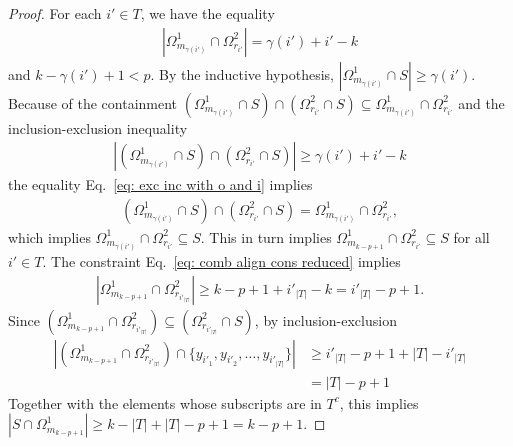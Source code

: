 \documentclass[10pt,a4paper]{amsart}
\newcommand{\Og}{\Omega}
\newcommand{\ga}{\gamma}
\begin{document}
\begin{proof}
For each \(i' \in T\), we have the equality
\begin{align}
\label{eq: exc inc with o and i}
| \Og^1_{m_{\ga(i')}} \cap \Og^2_{r_{i'}}| = \ga(i') + i' - k
\end{align}
and \(k-\ga(i')+1 < p\). By the inductive hypothesis,  \(|\Og^1_{m_{\ga(i')}} \cap S| \geq \ga(i')\). 
Because of the containment \((\Og^1_{m_{\ga(i')}} \cap S) \cap (\Og^2_{r_{i'}} \cap S) \subseteq \Og^1_{m_{\ga(i')}} \cap \Og^2_{r_{i'}}\) and the inclusion-exclusion inequality
\begin{gather}
| (\Og^1_{m_{\ga(i')}} \cap S) \cap (\Og^2_{r_{i'}} \cap S)| \geq \ga(i') + i' - k
\end{gather}
the equality Eq.~\ref{eq: exc inc with o and i} implies 
\begin{gather}
\label{eq: equality of sets}
(\Og^1_{m_{\ga(i')}} \cap S) \cap (\Og^2_{r_{i'}} \cap S) = \Og^1_{m_{\ga(i')}} \cap \Og^2_{r_{i'}},
\end{gather}
which implies \(\Og^1_{m_{\ga(i')}} \cap \Og^2_{r_{i'}} \subseteq S\). This in turn implies \(\Og^1_{m_{k-p+1}} \cap \Og^2_{r_{i'}} \subseteq S\) for all \(i' \in T\). The constraint Eq.~\ref{eq: comb align cons reduced} implies
\begin{gather} 
|\Og^1_{m_{k-p+1}} \cap \Og^2_{r_{i'_{|T|}}}| \geq k-p+1+ i'_{|T|} - k = i'_{|T|} - p + 1.
\end{gather}
Since \(({\Og^1_{m_{k-p+1}}} \cap {\Og^2_{r_{i'_{|T|}}}}) \subseteq ({\Og^2_{r_{i'_{|T|}}}} \cap S)\), by inclusion-exclusion
\begin{align}
    |({\Og^1_{m_{k-p+1}}} \cap {\Og^2_{r_{i'_{|T|}}}}) \cap \{y_{i'_1}, y_{i'_2}, \ldots, y_{i'_{|T|}}\}| &\geq i'_{|T|} -p + 1 + |T| - i'_{|T|} \\
    &= |T| - p +1
\end{align}
Together with the elements whose subscripts are in \(T^c\), this implies
\( | S \cap \Og^1_{m_{k-p+1}}| \geq k - |T| + |T| - p + 1 = k - p + 1.\) \end{proof}
\end{document}
